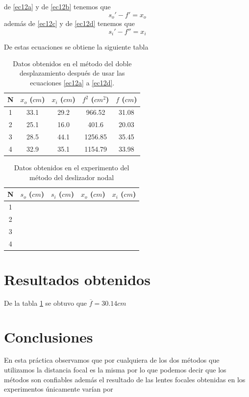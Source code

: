 \documentclass[13,twocolumn,letterpaper]{article}
\begin{document}
{ de \ref{ec12a} y de \ref{ec12b} tenemos que 
\begin{equation}\label{ec14}
	s_{o}'-f'=x_{o}
\end{equation}
adem\'as de \ref{ec12c} y de \ref{ec12d} tenemos que 
\begin{equation}\label{ec15}
s_{i}'-f''=x_{i}
\end{equation}

De estas ecuaciones se obtiene la siguiente tabla 
\begin{table}[htb]
	\centering
	\begin{tabular}{ccccc}
		N & $x_{o}$ ($cm$) & $x_{i}$ ($cm$) & $f^{2}$  ($cm^{2}$) & $f$ ($cm$)  \\ \midrule
		1 &	33.1 & 29.2	& 966.52  & 31.08	\\
		2 &	25.1 & 16.0	& 401.6	  & 20.03	\\
		3 &	28.5 & 44.1	& 1256.85 & 35.45	\\
		4 &	32.9 & 35.1	& 1154.79 & 33.98	\\\hline
	\end{tabular}
	\caption{Datos obtenidos en el m\'etodo del doble desplazamiento despu\'es de usar las ecuaciones \ref{ec12a} a \ref{ec12d}.} \label{tabla2}
\end{table}
\begin{table}[htb]
	\centering
	\begin{tabular}{ccccc}
		N & $s_{o}$ ($cm$) & $s_{i}$ ($cm$) & $x_{o}$  ($cm$) & $x_{i}$ ($cm$)  \\ \midrule
		1  &  &  & & \\
		2  &  &  & & \\
		3  &  &  & & \\
		4  &  &  & & \\\hline
	\end{tabular}
	\caption{Datos obtenidos en el experimento del m\'etodo del deslizador nodal} \label{tabla3}
\end{table}
 
}

\section{Resultados obtenidos}
	{
		De la tabla \ref{tabla2} se obtuvo que $\overline{f}=30.14 cm$
	}

\section{Conclusiones}
	{
		En esta pr\'actica observamos  que por cualquiera de los dos m\'etodos que utilizamos la distancia focal es la misma por lo que podemos decir que los m\'etodos son confiables adem\'as el resultado de las lentes focales obtenidas en los experimentos \'unicamente var\'ian por
	}
	
	\nocite{Hecht}\nocite{Rossi}\nocite{Sears}\nocite{Born}\nocite{Tipler}\nocite{Feynman}\nocite{Res}
	
	
\end{document}
